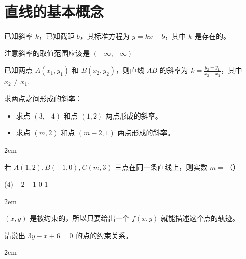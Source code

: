 \section{直线的基本概念}

\begin{definition}[斜截式]
    已知斜率 $k$，已知截距 $b$，其标准方程为 $y=kx+b$，其中 $k$ 是存在的。

    \begin{tips}
        注意斜率的取值范围应该是 $(-\infty, +\infty)$
    \end{tips}

\end{definition}

\begin{theorem}[两点间的斜率公式]
    已知两点 $A(x_1, y_1)$ 和 $B(x_2, y_2)$，则直线 $AB$ 的斜率为 $k = \frac{y_2 - y_1}{x_2 - x_1}$，其中 $x_2 \neq x_1$.
\end{theorem}

\begin{example}
    求两点之间形成的斜率：
    \begin{itemize}
        \item 求点 $(3,-4)$ 和点 $(1,2)$ 两点形成的斜率。
        \item 求点 $(m, 2)$ 和点 $(m-2, 1)$ 两点形成的斜率。
    \end{itemize}
\end{example}

\v{2em}

\begin{example}
    若 $A(1,2), B(-1,0), C(m, 3)$ 三点在同一条直线上，则实数 $m=$（\quad）
    \begin{tasks}(4)
        \task $-2$
        \task $-1$
        \task $0$
        \task $1$
    \end{tasks}
\end{example}

\v{2em}

\begin{theorem}[平面上的点的约束关系]
    $(x,y)$ 是被约束的，所以只要给出一个 $f(x,y)$ 就能描述这个点的轨迹。
\end{theorem}

\begin{example}
    请说出 $3y-x+6=0$ 的点的约束关系。
\end{example}

\v{2em}

